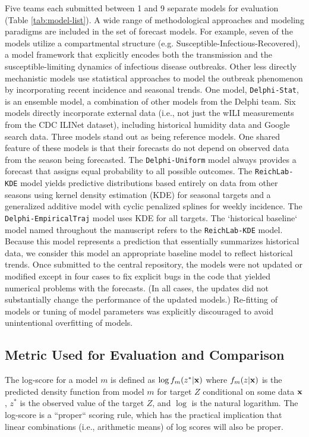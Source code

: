 \documentclass{article}\usepackage[]{graphicx}\usepackage[]{color}
\begin{document}
Five teams each submitted between 1 and 9 separate models for evaluation (Table \ref{tab:model-list}). 
A wide range of methodological approaches and modeling paradigms are included in the set of forecast models.
For example, seven of the models utilize a compartmental structure (e.g. Susceptible-Infectious-Recovered), a model framework that explicitly encodes both the transmission and the susceptible-limiting dynamics of infectious disease outbreaks.
Other less directly mechanistic models use statistical approaches to model the outbreak phenomenon by incorporating recent incidence and seasonal trends.
One model, {\tt Delphi-Stat}, is an ensemble model, a combination of other models from the Delphi team.
Six models directly incorporate external data (i.e., not just the wILI measurements from the CDC ILINet dataset), including historical humidity data and Google search data.
Three models stand out as being reference models. 
One shared feature of these models is that their forecasts do not depend on observed data from the season being forecasted. 
The {\tt Delphi-Uniform} model always provides a forecast that assigns equal probability to all possible outcomes. 
The {\tt ReichLab-KDE} model yields predictive distributions based entirely on data from other seasons using kernel density estimation (KDE) for seasonal targets and a generalized additive model with cyclic penalized splines for weekly incidence.
The {\tt Delphi-EmpiricalTraj} model uses KDE for all targets.
The `historical baseline` model named throughout the manuscript refers to the {\tt ReichLab-KDE} model.
Because this model represents a prediction that essentially summarizes historical data, we consider this model an appropriate baseline model to reflect historical trends.
Once submitted to the central repository, the models were not updated or modified except in four cases to fix explicit bugs in the code that yielded numerical problems with the forecasts. 
(In all cases, the updates did not substantially change the performance of the updated models.)
Re-fitting of models or tuning of model parameters was explicitly discouraged to avoid unintentional overfitting of models.

\subsection*{Metric Used for Evaluation and Comparison}

The log-score for a model $m$ is defined as $\log f_m(z^*|\bf{x})$ where $f_m(z|\bf{x})$ is the predicted density function from model $m$ for target $Z$ conditional on some data $\bf{x}$, $z^*$ is the observed value of the target $Z$, and $\log$ is the natural logarithm. 
The log-score is a ``proper`` scoring rule, which has the practical implication that linear combinations (i.e., arithmetic means) of log scores will also be proper.\cite{Gneiting2007}
\end{document}

